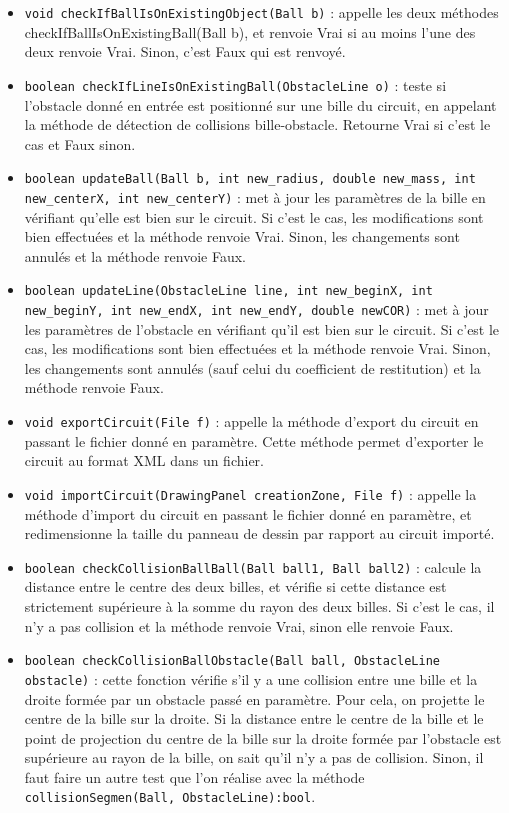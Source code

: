 \documentclass{report}
\begin{document}
\begin{itemize}
\item \texttt{void checkIfBallIsOnExistingObject(Ball b)} : appelle les deux méthodes checkIfBallIsOnExistingBall(Ball b), et renvoie Vrai si au moins l'une des deux renvoie Vrai. Sinon, c'est Faux qui est renvoyé.
\item \texttt{boolean checkIfLineIsOnExistingBall(ObstacleLine o)} : teste si l'obstacle donné en entrée est positionné sur une bille du circuit, en appelant la méthode de détection de collisions bille-obstacle. Retourne Vrai si c'est le cas et Faux sinon.
\item \texttt{boolean updateBall(Ball b, int new\_radius, double new\_mass, int new\_centerX, int new\_centerY)} : met à jour les paramètres de la bille en vérifiant qu'elle est bien sur le circuit. Si c'est le cas, les modifications sont bien effectuées et la méthode renvoie Vrai. Sinon, les changements sont annulés et la méthode renvoie Faux.
\item \texttt{boolean updateLine(ObstacleLine line, int new\_beginX, int new\_beginY, int new\_endX, int new\_endY, double newCOR)} : met à jour les paramètres de l'obstacle en vérifiant qu'il est bien sur le circuit. Si c'est le cas, les modifications sont bien effectuées et la méthode renvoie Vrai. Sinon, les changements sont annulés (sauf celui du coefficient de restitution) et la méthode renvoie Faux.
\item \texttt{void exportCircuit(File f)} : appelle la méthode d'export du circuit en passant le fichier donné en paramètre. Cette méthode permet d'exporter le circuit au format XML dans un fichier.
\item \texttt{void importCircuit(DrawingPanel creationZone, File f)} : appelle la méthode d'import du circuit en passant le fichier donné en paramètre, et redimensionne la taille du panneau de dessin par rapport au circuit importé.
\item \texttt{boolean checkCollisionBallBall(Ball ball1, Ball ball2)} : calcule la distance entre le centre des deux billes, et vérifie si cette distance est strictement supérieure à la somme du rayon des deux billes. Si c'est le cas, il n'y a pas collision et la méthode renvoie Vrai, sinon elle renvoie Faux.
\item \texttt{boolean checkCollisionBallObstacle(Ball ball, ObstacleLine obstacle)} : cette fonction vérifie s'il y a une collision entre une bille et la droite formée par un obstacle passé en paramètre. Pour cela, on projette le centre de la bille sur la droite. Si la distance entre le centre de la bille et le point de projection du centre de la bille sur la droite formée par l'obstacle est supérieure au  rayon de la bille, on sait qu'il n'y a pas de collision. Sinon, il faut faire un autre test que l'on réalise avec la méthode \texttt{collisionSegmen(Ball, ObstacleLine):bool}.

\end{itemize}
\end{document}
